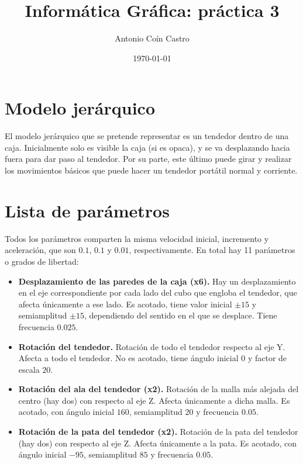 \documentclass[11pt,a4paper]{article}
\title{Informática Gráfica: práctica 3}
\author{Antonio Coín Castro}
\date{\today}
\begin{document}
\maketitle

\section*{Modelo jerárquico}

El modelo jerárquico que se pretende representar es un tendedor dentro de una caja. Inicialmente solo es visible la caja (si es opaca), y se va desplazando hacia fuera para dar paso al tendedor. Por su parte, este último puede girar y realizar los movimientos básicos que puede hacer un tendedor portátil normal y corriente.

\section*{Lista de parámetros}

Todos los parámetros comparten la misma velocidad inicial, incremento y aceleración, que son $0.1$, $0.1$ y $0.01$, respectivamente. En total hay 11 parámetros o grados de libertad:

\begin{itemize}
  \item \textbf{Desplazamiento de las paredes de la caja (x6).} Hay un desplazamiento en el eje correspondiente por cada lado del cubo que engloba el tendedor, que afecta únicamente a ese lado. Es acotado, tiene valor inicial $\pm 15$ y semiamplitud $\pm 15$, dependiendo del sentido en el que se desplace. Tiene frecuencia $0.025$.
  \item \textbf{Rotación del tendedor.} Rotación de todo el tendedor respecto al eje Y. Afecta a todo el tendedor. No es acotado, tiene ángulo inicial $0$ y factor de escala $20$. 
  \item \textbf{Rotación del ala del tendedor (x2).} Rotación de la malla más alejada del centro (hay dos) con respecto al eje Z. Afecta únicamente a dicha malla. Es acotado, con ángulo inicial $160$, semiamplitud $20$ y frecuencia $0.05$.
  \item \textbf{Rotación de la pata del tendedor (x2).} Rotación de la pata del tendedor (hay dos) con respecto al eje Z. Afecta únicamente a la pata. Es acotado, con ángulo inicial $-95$, semiamplitud $85$ y frecuencia $0.05$.
\end{itemize}

\newpage
\end{document}
